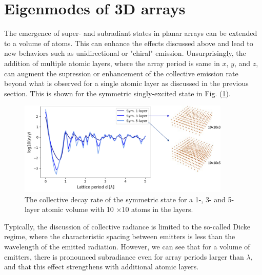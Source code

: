 \section{Eigenmodes of 3D arrays}
The emergence of super- and subradiant states in planar arrays can be extended to a volume of atoms. This can enhance the effects discussed above and lead to new behaviors such as unidirectional or "chiral" emission\cite{grankin2018free}. Unsurprisingly, the addition of multiple atomic layers, where the array period is same in $x$, $y$, and $z$, can augment the supression or enhancement of the collective emission rate beyond what is observed for a single atomic layer as discussed in the previous section. This is shown for the symmetric singly-excited state in Fig. (\ref{fig:superradiance_volumetric}).
\begin{figure}[!ht]
    \centering
    \includegraphics[width=0.9\textwidth]{Images/collective_radiance_in_volumetric_arrays.pdf}
    \caption{The collective decay rate of the symmetric state for a 1-, 3- and 5-layer atomic volume with 10
    $\times$10 atoms in the layers.}
    \label{fig:superradiance_volumetric}
\end{figure}
Typically, the discussion of collective radiance is limited to the so-called Dicke regime, where the characteristic spacing between emitters is less than the wavelength of the emitted radiation. However, we can see that for a volume of emitters, there is pronounced subradiance even for array periods larger than $\lambda$, and that this effect strengthens with additional atomic layers. 





